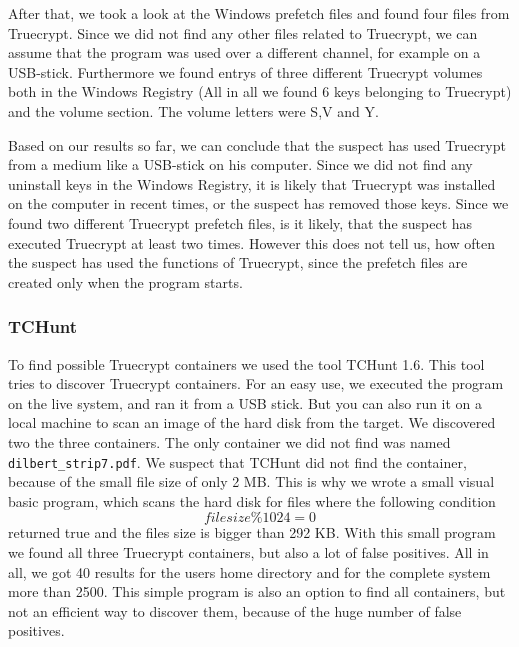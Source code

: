 After that, we took a look at the Windows prefetch files and found four files from Truecrypt. 
Since we did not find any other files related to Truecrypt, we can assume that the program was used over a different channel, for example on a USB-stick. 
Furthermore we found entrys of three different Truecrypt volumes both in the  Windows Registry (All in all we found 6 keys belonging to Truecrypt) and the volume section. 
The volume letters were S,V and Y.

Based on our results so far, we can conclude that the suspect has used Truecrypt from a medium like a USB-stick on his computer. 
Since we did not find any uninstall keys in the  Windows Registry, it is likely that Truecrypt was installed on the computer in recent times, or the suspect has removed those keys. 
Since we found two different Truecrypt prefetch files, is it likely, that the suspect has executed Truecrypt at least two times. 
However this does not tell us, how often the suspect has used the functions of Truecrypt, since the prefetch files are created only when the program starts.

\subsubsection{TCHunt}
To find possible Truecrypt containers we used the tool TCHunt 1.6. 
This tool tries to discover Truecrypt containers. 
For an easy use, we executed the program on the live system, and ran it from a USB stick. 
But you can also run it on a local machine to scan an image of the hard disk from the target. 
We discovered two the three containers. 
The only container we did not find was named \texttt{dilbert\_strip7.pdf}. 
We suspect that TCHunt did not find the container, because of the small file size of only 2 MB. 
This is why we wrote a small visual basic program, which scans the hard disk for files where the following condition  \[filesize \% 1024 = 0\] returned true and the files size is bigger than 292 KB. 
With this small program we found all three Truecrypt containers, but also a lot of false positives. 
All in all, we got 40 results for the users home directory and for the complete system more than 2500. 
This simple program is also an option to find all containers, but not an efficient way to discover them, because of the huge number of false positives.  

